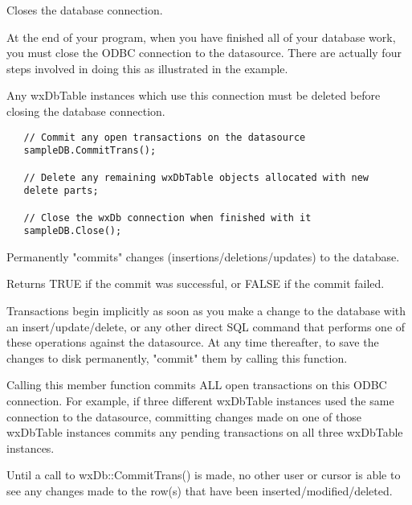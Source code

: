 \label{wxdbclose}


Closes the database connection.


At the end of your program, when you have finished all of your database work, 
you must close the ODBC connection to the datasource.  There are actually 
four steps involved in doing this as illustrated in the example.  

Any wxDbTable instances which use this connection must be deleted before 
closing the database connection.


\begin{verbatim}
   // Commit any open transactions on the datasource
   sampleDB.CommitTrans();

   // Delete any remaining wxDbTable objects allocated with new
   delete parts;

   // Close the wxDb connection when finished with it
   sampleDB.Close();
\end{verbatim}


\label{wxdbcommittrans}


Permanently "commits" changes (insertions/deletions/updates) to the database.  


Returns TRUE if the commit was successful, or FALSE if the commit failed.


Transactions begin implicitly as soon as you make a change to the database 
with an insert/update/delete, or any other direct SQL command that performs 
one of these operations against the datasource.  
At any time thereafter, to save the changes to disk permanently, "commit" 
them by calling this function.

Calling this member function commits ALL open transactions on this ODBC 
connection.  For example, if three different wxDbTable instances used the 
same connection to the datasource, committing changes made on one of those 
wxDbTable instances commits any pending transactions on all three wxDbTable 
instances.

Until a call to wxDb::CommitTrans() is made, no other user or cursor is able 
to see any changes made to the row(s) that have been inserted/modified/deleted.


